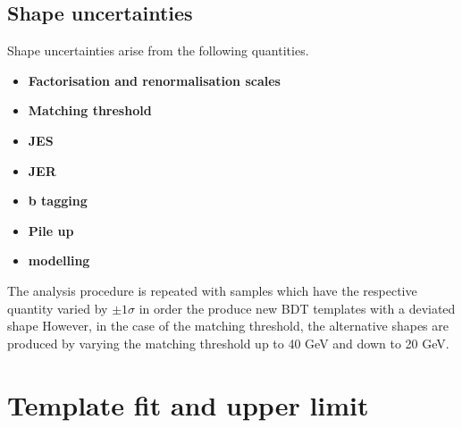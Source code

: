 \subsection{Shape uncertainties}
 Shape uncertainties arise from the following quantities.
 \begin{itemize}
\item \textbf{Factorisation and renormalisation scales}
\item \textbf{Matching threshold}
\item \textbf{JES}
\item \textbf{JER}
\item \textbf{b tagging}
\item \textbf{Pile up}
\item \textbf{\heavyflavour modelling}
 \end{itemize}
 
The analysis procedure is repeated with \ttbar samples which have the respective quantity varied by $\pm 1 \sigma$ in order the produce new BDT templates with a deviated shape However, in the case of the matching threshold, the alternative shapes are produced by varying the matching threshold up to 40 GeV and down to 20 GeV.

\section{Template fit and upper limit}
\label{sec:limit}

